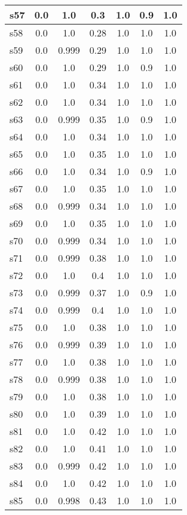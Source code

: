 \documentclass{article}
\begin{document}
\begin{tabular}{|l|c|c|c|c|c|c|}
s57 &0.0 & 1.0 & 0.3 & 1.0 & 0.9 & 1.0\\
\hline
s58 &0.0 & 1.0 & 0.28 & 1.0 & 1.0 & 1.0\\
\hline
s59 &0.0 & 0.999 & 0.29 & 1.0 & 1.0 & 1.0\\
\hline
s60 &0.0 & 1.0 & 0.29 & 1.0 & 0.9 & 1.0\\
\hline
s61 &0.0 & 1.0 & 0.34 & 1.0 & 1.0 & 1.0\\
\hline
s62 &0.0 & 1.0 & 0.34 & 1.0 & 1.0 & 1.0\\
\hline
s63 &0.0 & 0.999 & 0.35 & 1.0 & 0.9 & 1.0\\
\hline
s64 &0.0 & 1.0 & 0.34 & 1.0 & 1.0 & 1.0\\
\hline
s65 &0.0 & 1.0 & 0.35 & 1.0 & 1.0 & 1.0\\
\hline
s66 &0.0 & 1.0 & 0.34 & 1.0 & 0.9 & 1.0\\
\hline
s67 &0.0 & 1.0 & 0.35 & 1.0 & 1.0 & 1.0\\
\hline
s68 &0.0 & 0.999 & 0.34 & 1.0 & 1.0 & 1.0\\
\hline
s69 &0.0 & 1.0 & 0.35 & 1.0 & 1.0 & 1.0\\
\hline
s70 &0.0 & 0.999 & 0.34 & 1.0 & 1.0 & 1.0\\
\hline
s71 &0.0 & 0.999 & 0.38 & 1.0 & 1.0 & 1.0\\
\hline
s72 &0.0 & 1.0 & 0.4 & 1.0 & 1.0 & 1.0\\
\hline
s73 &0.0 & 0.999 & 0.37 & 1.0 & 0.9 & 1.0\\
\hline
s74 &0.0 & 0.999 & 0.4 & 1.0 & 1.0 & 1.0\\
\hline
s75 &0.0 & 1.0 & 0.38 & 1.0 & 1.0 & 1.0\\
\hline
s76 &0.0 & 0.999 & 0.39 & 1.0 & 1.0 & 1.0\\
\hline
s77 &0.0 & 1.0 & 0.38 & 1.0 & 1.0 & 1.0\\
\hline
s78 &0.0 & 0.999 & 0.38 & 1.0 & 1.0 & 1.0\\
\hline
s79 &0.0 & 1.0 & 0.38 & 1.0 & 1.0 & 1.0\\
\hline
s80 &0.0 & 1.0 & 0.39 & 1.0 & 1.0 & 1.0\\
\hline
s81 &0.0 & 1.0 & 0.42 & 1.0 & 1.0 & 1.0\\
\hline
s82 &0.0 & 1.0 & 0.41 & 1.0 & 1.0 & 1.0\\
\hline
s83 &0.0 & 0.999 & 0.42 & 1.0 & 1.0 & 1.0\\
\hline
s84 &0.0 & 1.0 & 0.42 & 1.0 & 1.0 & 1.0\\
\hline
s85 &0.0 & 0.998 & 0.43 & 1.0 & 1.0 & 1.0\\
\hline

\end{tabular}
\end{document}
